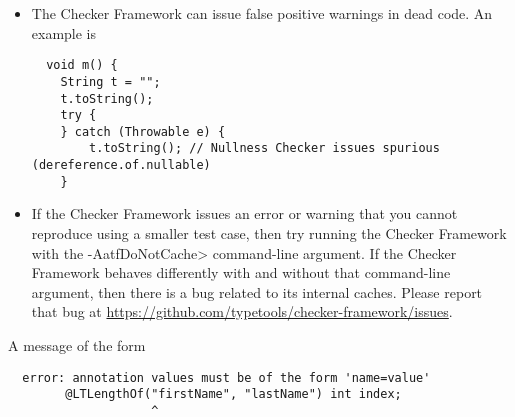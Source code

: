 \begin{itemize}
\noindent
you will get an error such as

\begin{smaller}
\begin{Verbatim}[]
[expression.unparsable] Expression in dependent type annotation invalid:
Use "#1" rather than "value"
\end{Verbatim}
\end{smaller}

Section~\ref{java-expressions-as-arguments} explains that you need to use
a different syntax to refer to a formal parameter:

\begin{smaller}
\begin{Verbatim}
public String(char value[], @IndexFor("#1") int offset, @IndexOrHigh("#1") int count) { ... }
\end{Verbatim}
\end{smaller}


\item
\label{false-positive-in-dead-code}
  The Checker Framework can issue false positive warnings in dead code.  An
  example is

\begin{smaller}
\begin{Verbatim}
  void m() {
    String t = "";
    t.toString();
    try {
    } catch (Throwable e) {
        t.toString(); // Nullness Checker issues spurious (dereference.of.nullable)
    }
\end{Verbatim}
\end{smaller}

\item
  If the Checker Framework issues an error or warning that you cannot
  reproduce using a smaller test case, then try running the Checker
  Framework with the \<-AatfDoNotCache> command-line argument.  If the
  Checker Framework behaves differently with and without that command-line
  argument, then there is a bug related to its internal caches.  Please
  report that bug at
  \url{https://github.com/typetools/checker-framework/issues}.

\end{itemize}



A message of the form

\begin{Verbatim}
  error: annotation values must be of the form 'name=value'
        @LTLengthOf("firstName", "lastName") int index;
                    ^
\end{Verbatim}

